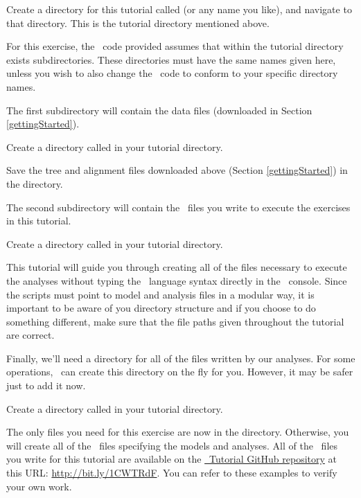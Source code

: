 \begin{framed}
Create a directory for this tutorial called {\textcolor{red}{}} (or any name you like), and navigate to that directory. This is the tutorial directory mentioned above.
\end{framed}

For this exercise, the \Rev~code provided assumes that within the tutorial directory exists  subdirectories. 
These directories must have the same names given here, unless you wish to also change the \Rev~code to conform to your specific directory names.

The first subdirectory will contain the data files (downloaded in Section \ref{gettingStarted}).
\begin{framed}
Create a directory called {\textcolor{red}{}} in your tutorial directory. 

Save the tree and alignment files downloaded above (Section \ref{gettingStarted}) in the  directory.
\end{framed}

The second subdirectory will contain the \Rev~files you write to execute the exercises in this tutorial. 
\begin{framed}
Create a directory called {\textcolor{red}{}} in your tutorial directory. 
\end{framed}
This tutorial will guide you through creating all of the files necessary to execute the analyses without typing the \Rev~language syntax directly in the \RevBayes~console. 
Since the scripts must point to model and analysis files in a modular way, it is important to be aware of you directory structure and if you choose to do something different, make sure that the file paths given throughout the tutorial are correct.

Finally, we'll need a directory for all of the files written by our analyses. For some operations, \RevBayes~can create this directory on the fly for you. 
However, it may be safer just to add it now.
\begin{framed}
Create a directory called {\textcolor{red}{}} in your tutorial directory.
\end{framed}

The only files you need for this exercise are now in the  directory. Otherwise, you will create all of the \Rev~files specifying the models and analyses. 
All of the \Rev~files you write for this tutorial are available on the \href{https://github.com/revbayes/revbayes_tutorial}{\RevBayes~Tutorial GitHub repository} at this URL: \href{http://bit.ly/1CWTRdF}{http://bit.ly/1CWTRdF}.
You can refer to these examples to verify your own work.

